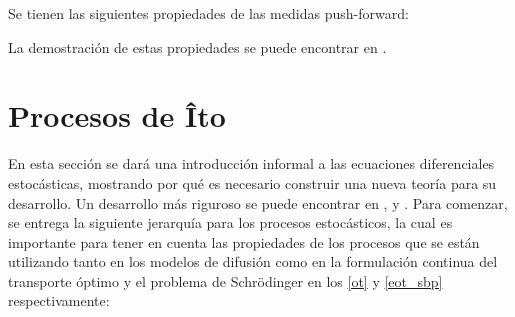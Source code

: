 Se tienen las siguientes propiedades de las medidas push-forward:


La demostración de estas propiedades se puede encontrar en \cite{Thorpe2018}.

\section{Procesos de Îto}
\label{sde}

En esta sección se dará una introducción informal a las ecuaciones diferenciales estocásticas, mostrando por qué es necesario construir una nueva teoría para su desarrollo. Un desarrollo más riguroso se puede encontrar en \cite{sarkkaSolin2019}, \cite{evans2013introduction} y \cite{karatzas1988brownian}. Para comenzar, se entrega la siguiente jerarquía para los procesos estocásticos, la cual es importante para tener en cuenta las propiedades de los procesos que se están utilizando tanto en los modelos de difusión como en la formulación continua del transporte óptimo y el problema de Schrödinger en los \autoref{ot} y \autoref{eot_sbp} respectivamente:

